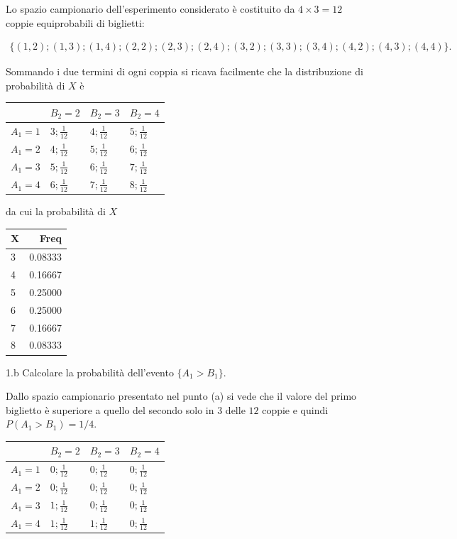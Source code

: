\documentclass[
  11pt,
]{book}
\theoremstyle{mytheoremstyle}
\theoremstyle{mydefstyle}
\newenvironment{sol}
  {
  \begin{tcolorbox}[enhanced,breakable,arc=0.1mm,boxrule=1pt,colback=white,colframe=iblue,
  title=\bf \fontfamily{lmss}\selectfont \hspace{.5 cm} Soluzione,drop fuzzy shadow]

}{
\end{tcolorbox}
  }
\begin{document}
\begin{sol}

Lo spazio campionario dell'esperimento considerato è costituito
da \(4\times 3=12\) coppie equiprobabili di biglietti:

\begin{eqnarray*}
\{(1,2); (1,3); (1,4); (2,2); (2,3); (2,4); (3,2); (3,3); (3,4); (4,2); (4,3); (4,4)\}.
\end{eqnarray*}

Sommando i due termini di ogni coppia si ricava facilmente
che la distribuzione di probabilità di \(X\) è

\begin{tabular}{llll}
\toprule
  & $B_2=2$ & $B_2=3$ & $B_2=4$\\
\midrule
$A_1=1$ & $3;\frac 1{12}$ & $4;\frac 1{12}$ & $5;\frac 1{12}$\\
$A_1=2$ & $4;\frac 1{12}$ & $5;\frac 1{12}$ & $6;\frac 1{12}$\\
$A_1=3$ & $5;\frac 1{12}$ & $6;\frac 1{12}$ & $7;\frac 1{12}$\\
$A_1=4$ & $6;\frac 1{12}$ & $7;\frac 1{12}$ & $8;\frac 1{12}$\\
\bottomrule
\end{tabular}

da cui la probabilità di \(X\)

\begin{tabular}{lr}
\toprule
X & Freq\\
\midrule
3 & 0.08333\\
4 & 0.16667\\
5 & 0.25000\\
6 & 0.25000\\
7 & 0.16667\\
8 & 0.08333\\
\bottomrule
\end{tabular}

\end{sol}

1.b Calcolare la probabilità dell'evento \(\{A_{1}>B_{1}\}\).

\begin{sol}

Dallo spazio campionario presentato nel punto (a)
si vede che il valore del primo biglietto è superiore
a quello del secondo solo in \(3\) delle \(12\) coppie
e quindi \(P(A_{1}>B_{1})=1/4\).

\begin{tabular}{llll}
\toprule
  & $B_2=2$ & $B_2=3$ & $B_2=4$\\
\midrule
$A_1=1$ & $0;\frac 1{12}$ & $0;\frac 1{12}$ & $0;\frac 1{12}$\\
$A_1=2$ & $0;\frac 1{12}$ & $0;\frac 1{12}$ & $0;\frac 1{12}$\\
$A_1=3$ & $1;\frac 1{12}$ & $0;\frac 1{12}$ & $0;\frac 1{12}$\\
$A_1=4$ & $1;\frac 1{12}$ & $1;\frac 1{12}$ & $0;\frac 1{12}$\\
\bottomrule
\end{tabular}

\end{sol}
\end{document}
